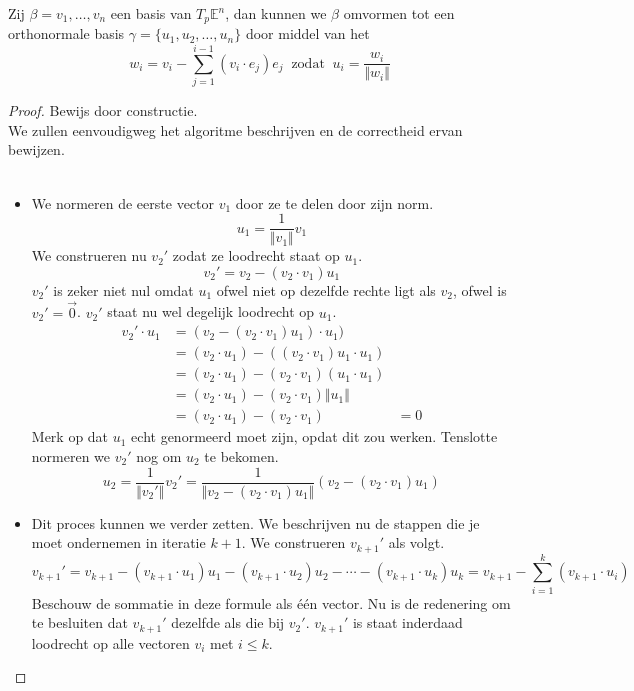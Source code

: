 \documentclass[main.tex]{subfiles}
\begin{document}
\begin{st}
  Zij $\beta = v_{1},\dotsc,v_{n}$ een basis van $T_{p}\mathbb{E}^{n}$, dan kunnen we $\beta$ omvormen tot een orthonormale basis $\gamma = \{u_1,u_2,\ldots,u_n\}$ door middel van het 
  \[ w_{i} = v_{i} - \sum_{j=1}^{i-1}(v_{i}\cdot e_{j})e_{j} \ \text{ zodat }\ u_{i}=\frac{w_{i}}{\Vert w_{i}\Vert}\]

  \begin{proof}
    Bewijs door constructie.\\
    We zullen eenvoudigweg het algoritme beschrijven en de correctheid ervan bewijzen.\\\\
    \begin{itemize}
    \item 
      We normeren de eerste vector $v_1$ door ze te delen door zijn norm.
      \[
      u_1 = \frac{1}{\Vert v_1\Vert}v_1
      \]
      We construeren nu $v_2'$ zodat ze loodrecht staat op $u_1$.
      \[
      v_2' = v_2 - (v_2 \cdot v_1) u_1
      \]
      $v_2'$ is zeker niet nul omdat $u_1$ ofwel niet op dezelfde rechte ligt als $v_2$, ofwel is $v_2' = \vec{0}$. $v_2'$ staat nu wel degelijk loodrecht op $u_1$.
      \[
      \begin{array}{rll}
        v_2' \cdot u_1 &= (v_2 - (v_2 \cdot v_1) u_1) \cdot u_1) &\\
        &= (v_2 \cdot u_1) - ((v_2 \cdot v_1) u_1 \cdot u_1) &\\
        &= (v_2 \cdot u_1) - (v_2 \cdot v_1) (u_1 \cdot u_1) &\\
        &= ( v_2 \cdot u_1) - (v_2 \cdot v_1) \Vert u_1\Vert &\\
        &= (v_2 \cdot u_1) - (v_2 \cdot v_1) &= 0
      \end{array}
      \]
      Merk op dat $u_1$ echt genormeerd moet zijn, opdat dit zou werken. Tenslotte normeren we $v_2'$ nog om $u_2$ te bekomen.
      \[
      u_2 = \frac{1}{\Vert v_2'\Vert}v_2' = \frac{1}{\Vert v_2 - (v_2 \cdot v_1) u_1\Vert}(v_2 - (v_2 \cdot v_1) u_1)
      \]
    \item
      Dit proces kunnen we verder zetten. We beschrijven nu de stappen die je moet ondernemen in iteratie $k+1$.
      We construeren $v_{k+1}'$ als volgt.
      \[
      v_{k+1}' = v_{k+1} - ( v_{k+1}\cdot u_1 ) u_1 - ( v_{k+1}\cdot u_2 )u_2 - \dotsb - (v_{k+1}\cdot u_k ) u_k
      = v_{k+1} - \sum_{i=1}^k (v_{k+1}\cdot u_i)
      \]
      Beschouw de sommatie in deze formule als \'e\'en vector. Nu is de redenering om te besluiten dat $v_{k+1}'$ dezelfde als die bij $v_2'$.
      $v_{k+1}'$ is staat inderdaad loodrecht op alle vectoren $v_i$ met $i\le k$.


\end{itemize}
\end{proof}
\end{st}
\end{document}

